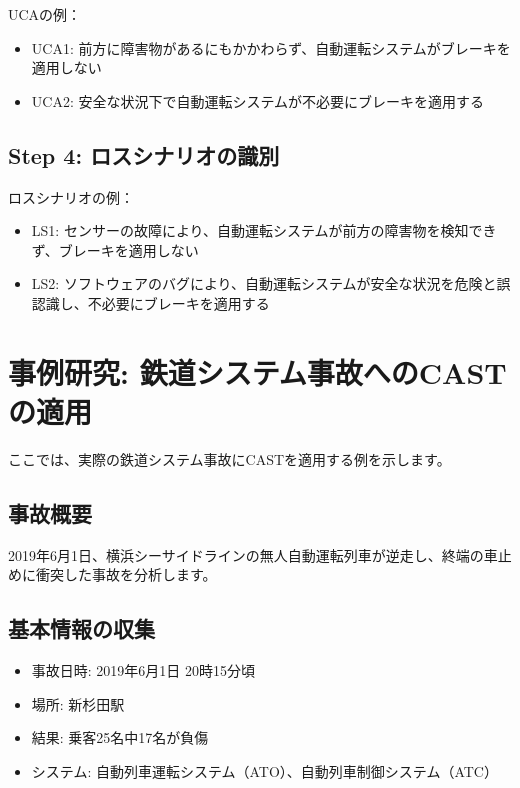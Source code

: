 UCAの例：
\begin{itemize}
    \item UCA1: 前方に障害物があるにもかかわらず、自動運転システムがブレーキを適用しない
    \item UCA2: 安全な状況下で自動運転システムが不必要にブレーキを適用する
\end{itemize}

\subsection{Step 4: ロスシナリオの識別}

ロスシナリオの例：
\begin{itemize}
    \item LS1: センサーの故障により、自動運転システムが前方の障害物を検知できず、ブレーキを適用しない
    \item LS2: ソフトウェアのバグにより、自動運転システムが安全な状況を危険と誤認識し、不必要にブレーキを適用する
\end{itemize}

\section{事例研究: 鉄道システム事故へのCASTの適用}

ここでは、実際の鉄道システム事故にCASTを適用する例を示します。

\subsection{事故概要}

2019年6月1日、横浜シーサイドラインの無人自動運転列車が逆走し、終端の車止めに衝突した事故を分析します。

\subsection{基本情報の収集}

\begin{itemize}
    \item 事故日時: 2019年6月1日 20時15分頃
    \item 場所: 新杉田駅
    \item 結果: 乗客25名中17名が負傷
    \item システム: 自動列車運転システム（ATO）、自動列車制御システム（ATC）
\end{itemize}

